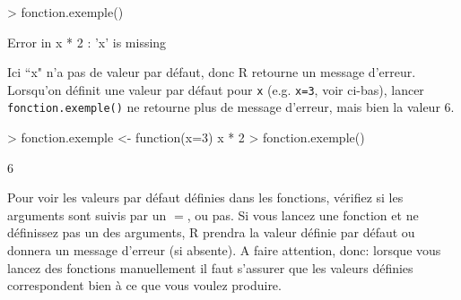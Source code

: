 \documentclass{article}
\begin{document}
\begin{Schunk}
\begin{Sinput}
> fonction.exemple()
\end{Sinput}
\end{Schunk}
\begin{Schunk}
\begin{Soutput}
Error in x * 2 : 'x' is missing
\end{Soutput}
\end{Schunk}
Ici ``x" n'a pas de valeur par défaut, donc R retourne un message
d'erreur. Lorsqu'on définit une valeur par défaut pour \texttt{x}
(e.g. \texttt{x=3}, voir ci-bas),
lancer \texttt{fonction.exemple()} ne retourne plus de message
d'erreur, mais bien la valeur $6$.
\begin{Schunk}
\begin{Sinput}
> fonction.exemple <- function(x=3) x * 2
> fonction.exemple()
\end{Sinput}
\begin{Soutput}
[1] 6
\end{Soutput}
\end{Schunk}

Pour voir les valeurs par défaut définies dans les fonctions,
vérifiez si les arguments sont suivis par un \texttt{$=$}, ou pas. Si vous lancez une
fonction et ne définissez pas un des arguments, R prendra la valeur
définie par défaut ou donnera un message d'erreur (si absente). A
faire attention, donc: lorsque vous lancez des fonctions manuellement
il faut s'assurer que les valeurs définies correspondent bien à ce que vous
voulez produire.


\begin{comment}
\section{Visualiser un tableau sous R}

De plus, pour visualiser un des tableaux produits directement sous R,
il suffit de lancer la commande manuellement dans la console comme
suit:

...

Pour voir les premières (ou dernières) 6 lignes du tableau, utiliser
la commande \texttt{head} (ou \texttt{tail}):

... et pour voir le tableau au complet vous tapez le nom de l'objet
dans la console.


Pour sélectionnez seulement les lignes où la station à la valeur ...

... et si vous vouliez seulement voir les colonnes ...

Les opérateurs logiques sous R sont:
== est égal à
!= n'est pas égal à
x \& y les deux conditions doivent être respectées
x | y l'une ou l'autre des conditions doivent être respectées
\end{comment}
\end{document}
